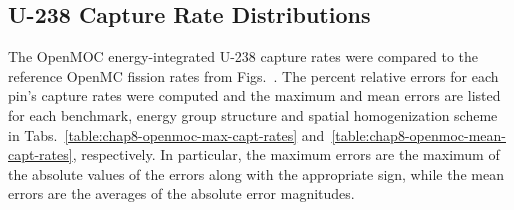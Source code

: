 \clearpage


\subsection{U-238 Capture Rate Distributions}
\label{subsec:chap8-capt-rates}

The OpenMOC energy-integrated U-238 capture rates were compared to the reference OpenMC fission rates from Figs.~. The percent relative errors for each pin's capture rates were computed and the maximum and mean errors are listed for each benchmark, energy group structure and spatial homogenization scheme in Tabs.~\ref{table:chap8-openmoc-max-capt-rates} and~\ref{table:chap8-openmoc-mean-capt-rates}, respectively. In particular, the maximum errors are the maximum of the absolute values of the errors along with the appropriate sign, while the mean errors are the averages of the absolute error magnitudes.

\vspace{0.1in}

